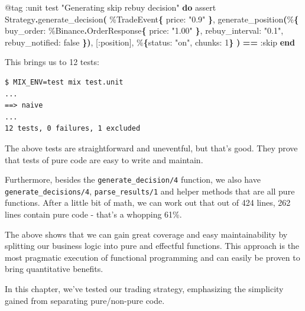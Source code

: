 \documentclass[
  oneside]{book}
\newenvironment{Shaded}{\begin{snugshade}}{\end{snugshade}}
\newcommand{\ConstantTok}[1]{\textcolor[rgb]{0.56,0.35,0.01}{#1}}
\newcommand{\DecValTok}[1]{\textcolor[rgb]{0.00,0.00,0.81}{#1}}
\newcommand{\FunctionTok}[1]{\textcolor[rgb]{0.13,0.29,0.53}{\textbf{#1}}}
\newcommand{\KeywordTok}[1]{\textcolor[rgb]{0.13,0.29,0.53}{\textbf{#1}}}
\newcommand{\NormalTok}[1]{#1}
\newcommand{\OperatorTok}[1]{\textcolor[rgb]{0.81,0.36,0.00}{\textbf{#1}}}
\newcommand{\OtherTok}[1]{\textcolor[rgb]{0.56,0.35,0.01}{#1}}
\newcommand{\StringTok}[1]{\textcolor[rgb]{0.31,0.60,0.02}{#1}}
\newcommand{\VariableTok}[1]{\textcolor[rgb]{0.00,0.00,0.00}{#1}}
\begin{document}
\begin{Shaded}
\begin{Highlighting}[]
  \OtherTok{@tag} \VariableTok{:unit}
\NormalTok{  test }\StringTok{"Generating skip rebuy decision"} \KeywordTok{do}
\NormalTok{    assert }\ConstantTok{Strategy}\OperatorTok{.}\NormalTok{generate\_decision}\FunctionTok{(}
\NormalTok{             \%}\ConstantTok{TradeEvent}\FunctionTok{\{}
               \VariableTok{price:} \StringTok{"0.9"}
             \FunctionTok{\}}\NormalTok{,}
\NormalTok{             generate\_position}\FunctionTok{(}\NormalTok{\%}\FunctionTok{\{}
               \VariableTok{buy\_order:}\NormalTok{ \%}\ConstantTok{Binance}\OperatorTok{.}\ConstantTok{OrderResponse}\FunctionTok{\{}
                 \VariableTok{price:} \StringTok{"1.00"}
               \FunctionTok{\}}\NormalTok{,}
               \VariableTok{rebuy\_interval:} \StringTok{"0.1"}\NormalTok{,}
               \VariableTok{rebuy\_notified:} \ConstantTok{false}
             \FunctionTok{\})}\NormalTok{,}
             \OtherTok{[}\VariableTok{:position}\OtherTok{]}\NormalTok{,}
\NormalTok{             \%}\FunctionTok{\{}\VariableTok{status:} \StringTok{"on"}\NormalTok{, }\VariableTok{chunks:} \DecValTok{1}\FunctionTok{\}}
           \FunctionTok{)} \OperatorTok{==} \VariableTok{:skip}
  \KeywordTok{end}
\end{Highlighting}
\end{Shaded}

This brings us to 12 tests:

\begin{verbatim}
$ MIX_ENV=test mix test.unit
...
==> naive
...
12 tests, 0 failures, 1 excluded
\end{verbatim}

The above tests are straightforward and uneventful, but that's good. They prove that tests of pure code are easy to write and maintain.

Furthermore, besides the \texttt{generate\_decision/4} function, we also have \texttt{generate\_decisions/4}, \texttt{parse\_results/1} and helper methods that are all pure functions. After a little bit of math, we can work out that out of 424 lines, 262 lines contain pure code - that's a whopping 61\%.

The above shows that we can gain great coverage and easy maintainability by splitting our business logic into pure and effectful functions. This approach is the most pragmatic execution of functional programming and can easily be proven to bring quantitative benefits.

In this chapter, we've tested our trading strategy, emphasizing the simplicity gained from separating pure/non-pure code.
\end{document}
